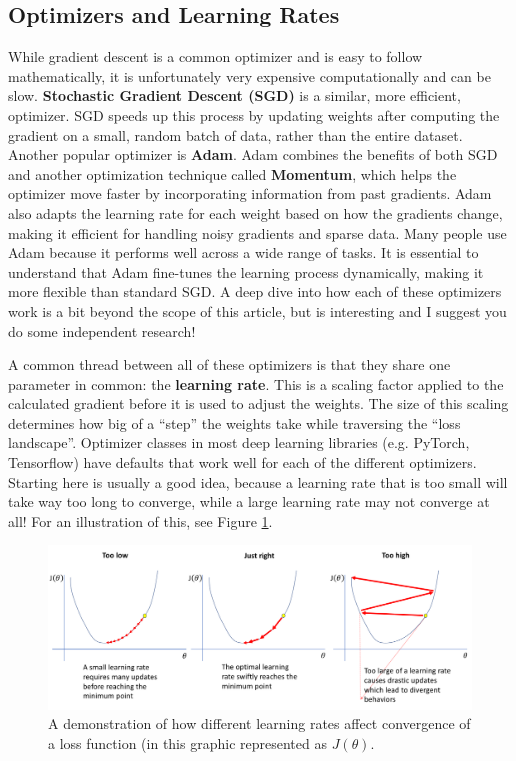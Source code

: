\subsection{Optimizers and Learning Rates}
    \large While gradient descent is a common optimizer and is easy to follow mathematically, it is unfortunately very expensive computationally and can be slow. \textbf{Stochastic Gradient Descent (SGD)} is a similar, more efficient, optimizer. SGD speeds up this process by updating weights after computing the gradient on a small, random batch of data, rather than the entire dataset. Another popular optimizer is \textbf{Adam}. Adam combines the benefits of both SGD and another optimization technique called \textbf{Momentum}, which helps the optimizer move faster by incorporating information from past gradients. Adam also adapts the learning rate for each weight based on how the gradients change, making it efficient for handling noisy gradients and sparse data. Many people use Adam because it performs well across a wide range of tasks. It is essential to understand that Adam fine-tunes the learning process dynamically, making it more flexible than standard SGD. A deep dive into how each of these optimizers work is a bit beyond the scope of this article, but is interesting and I suggest you do some independent research! 
    
    A common thread between all of these optimizers is that they share one parameter in common: the \textbf{learning rate}. This is a scaling factor applied to the calculated gradient before it is used to adjust the weights. The size of this scaling determines how big of a ``step'' the weights take while traversing the ``loss landscape''. Optimizer classes in most deep learning libraries (e.g. PyTorch, Tensorflow) have defaults that work well for each of the different optimizers. Starting here is usually a good idea, because a learning rate that is too small will take way too long to converge, while a large learning rate may not converge at all! For an illustration of this, see Figure \ref{fig:lr}.

    \begin{figure}[H]
        \centering
        \includegraphics[width=1\linewidth]{dl/lr.png}
        \caption{A demonstration of how different learning rates affect convergence of a loss function (in this graphic represented as $J(\theta).$}
        \label{fig:lr}
    \end{figure}

